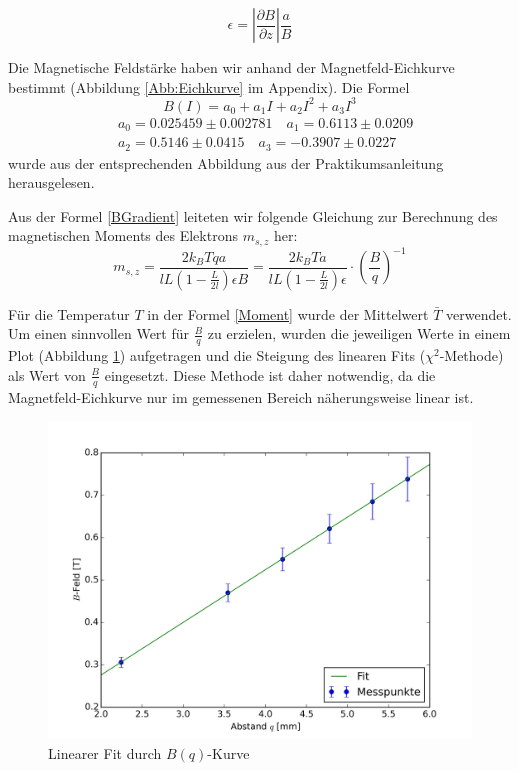\documentclass[a4paper,parskip,11pt, DIV12]{scrreprt}
\begin{document}
\begin{equation} \label{BGradient}
\epsilon = \left|\frac{\partial B}{\partial z}\right| \frac{a}{B}
\end{equation}

Die Magnetische Feldstärke haben wir anhand der Magnetfeld-Eichkurve bestimmt (Abbildung \ref{Abb:Eichkurve} im Appendix). Die Formel \begin{equation}
B(I) = a_0 + a_1 I + a_2 I^2 + a_3 I^3
\end{equation} \begin{align*}
&a_0 = 0.025459 \pm 0.002781 \quad
a_1 = 0.6113 \pm 0.0209 \\ 
&a_2 = 0.5146 \pm 0.0415 \quad
a_3 = -0.3907 \pm 0.0227
\end{align*} wurde aus der entsprechenden Abbildung aus der Praktikumsanleitung herausgelesen.

Aus der Formel \ref{BGradient} leiteten wir folgende Gleichung zur Berechnung des magnetischen Moments des Elektrons $m_{s,z}$ her:
\begin{equation} \label{Moment}
m_{s,z}=\frac{2k_BTqa}{lL(1-\frac{L}{2l})\epsilon B} = \frac{2k_BTa}{lL(1-\frac{L}{2l})\epsilon} \cdot \left(\frac{B}{q}\right)^{-1}
\end{equation}

Für die Temperatur $T$ in der Formel \ref{Moment} wurde der Mittelwert $\bar{T}$ verwendet. Um einen sinnvollen Wert für $\frac{B}{q}$ zu erzielen, wurden die jeweiligen Werte in einem Plot (Abbildung \ref{Abb:B/q}) aufgetragen und die Steigung des linearen Fits ($\chi^2$-Methode) als Wert von $\frac{B}{q}$ eingesetzt. Diese Methode ist daher notwendig, da die Magnetfeld-Eichkurve nur im gemessenen Bereich näherungsweise linear ist.

\begin{figure}[H]
\centering
\includegraphics[scale=0.1]{Plot}
\caption[Plot]{Linearer Fit durch $B(q)$-Kurve}
\label{Abb:B/q}
\end{figure}
\end{document}
